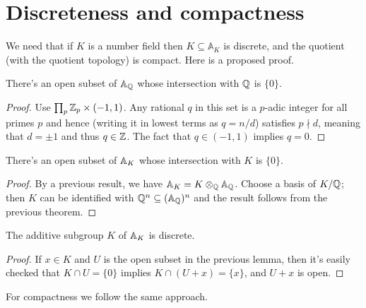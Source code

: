 \section{Discreteness and compactness}

We need that if $K$ is a number field then
$K\subseteq\mathbb{A}_K$ is discrete, and the quotient (with the
quotient topology) is compact. Here is a proposed proof.

\begin{theorem}
  \label{Rat.AdeleRing.zero_discrete}
  \leanok
  There's an open subset of $\mathbb{A}_{\mathbb{Q}}$ whose intersection with $\mathbb{Q}$ is $\{0\}$.
\end{theorem}
\begin{proof}
  Use $\prod_p{\mathbb{Z}_p}\times(-1,1)$. Any rational $q$ in this set is a $p$-adic
  integer for all primes $p$ and hence (writing it in lowest terms as $q=n/d$)
  satisfies $p\nmid d$, meaning that $d=\pm1$ and thus $q\in\mathbb{Z}$. The fact
  that $q\in(-1,1)$ implies $q=0$.
\end{proof}

\begin{theorem}
  \label{NumberField.AdeleRing.zero_discrete}
  \leanok
  There's an open subset of $\mathbb{A}_{K}$ whose intersection with $K$ is $\{0\}$.
\end{theorem}
\begin{proof}
  By a previous result, we have $\mathbb{A}_K=K\otimes_{\mathbb{Q}}\mathbb{A}_{\mathbb{Q}}$.
  Choose a basis of $K/\mathbb{Q}$; then $K$ can be identified with $\mathbb{Q}^n\subseteq(\mathbb{A}_{\mathbb{Q}})^n$
  and the result follows from the previous theorem.
\end{proof}

\begin{theorem}
  \label{NumberField.AdeleRing.discrete}
  \leanok
  The additive subgroup $K$ of $\mathbb{A}_K$ is discrete.
\end{theorem}
\begin{proof}
  If $x\in K$ and $U$ is the open subset in the previous lemma, then
  it's easily checked that $K\cap U=\{0\}$ implies $K\cap (U+x)=\{x\}$,
  and $U+x$ is open.
\end{proof}

For compactness we follow the same approach.

